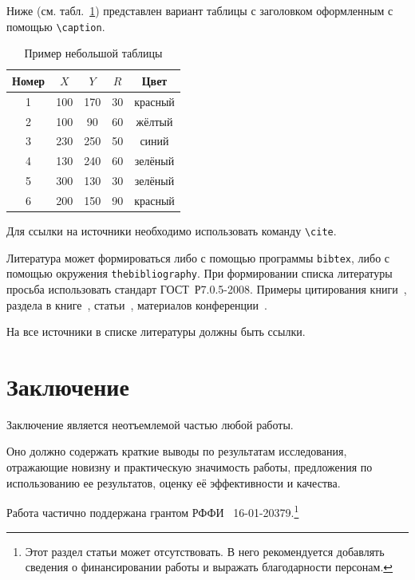 \documentclass[60x84/16,8pt]{ittmm}
\begin{document}
Ниже (см. табл.~\ref{tab:sampletable}) представлен вариант таблицы с
заголовком оформленным с помощью \verb"\caption".

\begin{table}
  \centering
  \caption{Пример небольшой таблицы}
  \label{tab:sampletable}
  \begin{tabular}{|c|c|c|c|c|}
    \hline
    Номер & $X$ & $Y$ & $R$ & Цвет\\
    \hline
    1 &     100  &  170 & 30 & красный\\
    2 &     100  &  90      & 60 & жёлтый\\
    3 &     230  &  250     & 50 & синий\\
    4 &     130  &  240 & 60 & зелёный\\
    5 & 300  &      130 & 30 & зелёный\\
    6 &     200  &  150     & 90 & красный\\
    \hline
  \end{tabular}
\end{table}

Для ссылки на источники необходимо использовать команду \verb"\cite".

Литература может формироваться либо с помощью программы \verb"bibtex",
либо с помощью окружения \verb"thebibliography".
При формировании списка литературы просьба использовать стандарт
ГОСТ~Р7.0.5-2008. Примеры цитирования книги~\cite{mathtensor,
  jones-fogelin:tcqd}, раздела в книге~\cite{Muller2006},
статьи~\cite{Arduengo1991, Booth1962},
материалов конференции~\cite{Hope2005}.

На все источники в списке литературы должны быть ссылки.

\section{Заключение}

Заключение является неотъемлемой частью любой работы. 

Оно должно содержать краткие выводы по результатам исследования,
отражающие новизну и практическую значимость работы, предложения по
использованию ее результатов, оценку её эффективности и качества.


\begin{acknowledgments}
  Работа частично поддержана грантом РФФИ
  \textnumero~16-01-20379.\footnote{Этот раздел статьи может
    отсутствовать.  В него рекомендуется добавлять сведения о
    финансировании работы и выражать благодарности персонам.}
\end{acknowledgments}
\end{document}
